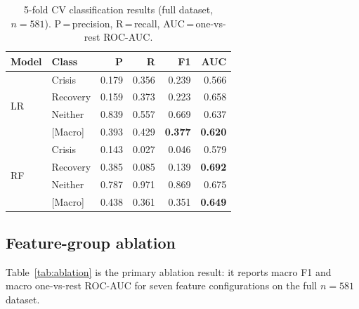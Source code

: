 \documentclass[11pt]{article}
\begin{document}
\begin{table}[h]
\small
\centering
\begin{tabular}{llrrrr}
\toprule
\textbf{Model} & \textbf{Class} & \textbf{P} & \textbf{R} & \textbf{F1} & \textbf{AUC} \\
\midrule
\multirow{4}{*}{LR}
  & Crisis    & 0.179 & 0.356 & 0.239 & 0.566 \\
  & Recovery  & 0.159 & 0.373 & 0.223 & 0.658 \\
  & Neither   & 0.839 & 0.557 & 0.669 & 0.637 \\
  & [Macro]   & 0.393 & 0.429 & \textbf{0.377} & \textbf{0.620} \\
\midrule
\multirow{4}{*}{RF}
  & Crisis    & 0.143 & 0.027 & 0.046 & 0.579 \\
  & Recovery  & 0.385 & 0.085 & 0.139 & \textbf{0.692} \\
  & Neither   & 0.787 & 0.971 & 0.869 & 0.675 \\
  & [Macro]   & 0.438 & 0.361 & 0.351 & \textbf{0.649} \\
\bottomrule
\end{tabular}
\caption{5-fold CV classification results (full dataset, $n{=}581$).
         P\,=\,precision, R\,=\,recall, AUC\,=\,one-vs-rest ROC-AUC.}
\label{tab:results}
\end{table}

\subsection{Feature-group ablation}
\label{sec:ablation}
Table~\ref{tab:ablation} is the primary ablation result: it reports
macro F1 and macro one-vs-rest ROC-AUC for seven feature configurations
on the full $n{=}581$ dataset.
\end{document}
